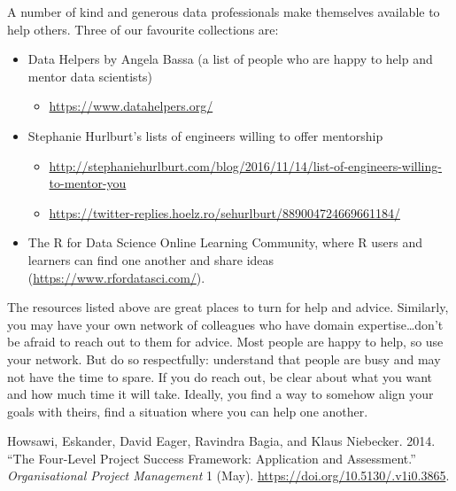 \documentclass[
]{book}
\providecommand{\tightlist}{%
  \setlength{\itemsep}{0pt}\setlength{\parskip}{0pt}}
\begin{document}
A number of kind and generous data professionals make themselves
available to help others. Three of our favourite collections are:

\begin{itemize}
\tightlist
\item
  Data Helpers by Angela Bassa (a list of people who are happy to help
  and mentor data scientists)

  \begin{itemize}
  \tightlist
  \item
    \url{https://www.datahelpers.org/}
  \end{itemize}
\item
  Stephanie Hurlburt's lists of engineers willing to offer mentorship

  \begin{itemize}
  \tightlist
  \item
    \url{http://stephaniehurlburt.com/blog/2016/11/14/list-of-engineers-willing-to-mentor-you}
  \item
    \url{https://twitter-replies.hoelz.ro/sehurlburt/889004724669661184/}
  \end{itemize}
\item
  The R for Data Science Online Learning Community, where R users and
  learners can find one another and share ideas
  (\url{https://www.rfordatasci.com/}).
\end{itemize}

The resources listed above are great places to turn for help and advice.
Similarly, you may have your own network of colleagues who have domain
expertise\ldots don't be afraid to reach out to them for advice. Most
people are happy to help, so use your network. But do so respectfully:
understand that people are busy and may not have the time to spare. If
you do reach out, be clear about what you want and how much time it will
take. Ideally, you find a way to somehow align your goals with theirs,
find a situation where you can help one another.

\hypertarget{refs}{}
\leavevmode\hypertarget{ref-Howsawi}{}%
Howsawi, Eskander, David Eager, Ravindra Bagia, and Klaus Niebecker.
2014. ``The Four-Level Project Success Framework: Application and
Assessment.'' \emph{Organisational Project Management} 1 (May).
\url{https://doi.org/10.5130/.v1i0.3865}.

\backmatter
\end{document}

